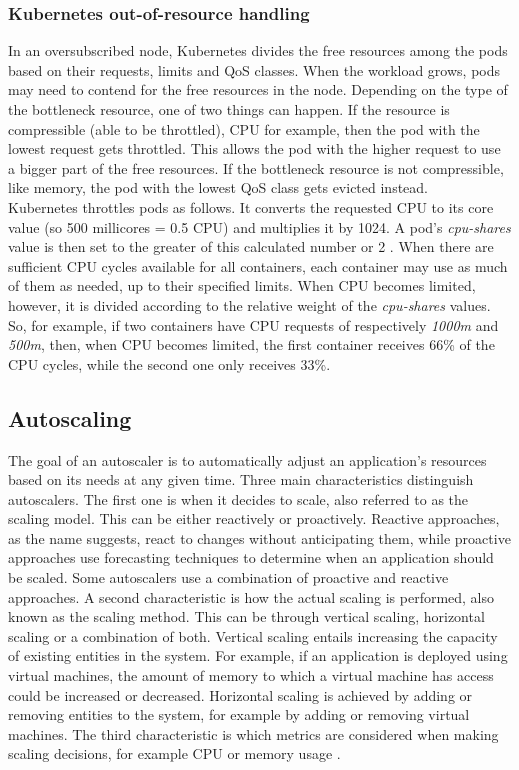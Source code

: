 \subsubsection{Kubernetes out-of-resource handling}\label{background:oversubscription}

In an oversubscribed node, Kubernetes divides the free resources among the pods based on their requests, limits and QoS classes. When the workload grows, pods may need to contend for the free resources in the node. Depending on the type of the bottleneck resource, one of two things can happen. If the resource is compressible (able to be throttled), CPU for example, then the pod with the lowest request gets throttled. This allows the pod with the higher request to use a bigger part of the free resources. If the bottleneck resource is not compressible, like memory, the pod with the lowest QoS class gets evicted instead. \\

Kubernetes throttles pods as follows. It converts the requested CPU to its core value (so 500 millicores = 0.5 CPU) and multiplies it by 1024. A pod's \textit{cpu-shares} value is then set to the greater of this calculated number or 2 \citep{Kubernetes-cpu-shares}. When there are sufficient CPU cycles available for all containers, each container may use as much of them as needed, up to their specified limits. When CPU becomes limited, however, it is divided according to the relative weight of the \textit{cpu-shares} values. So, for example, if two containers have CPU requests of respectively \textit{1000m} and \textit{500m}, then, when CPU becomes limited, the first container receives 66\% of the CPU cycles, while the second one only receives 33\%\citep{Docker-cpu-shares}.\\

\subsection{Autoscaling}
The goal of an autoscaler is to automatically adjust an application's resources based on its needs at any given time. Three main characteristics distinguish autoscalers. 
The first one is when it decides to scale, also referred to as the scaling model. This can be either reactively or proactively. Reactive approaches, as the name suggests, react to changes without anticipating them, while proactive approaches use forecasting techniques to determine when an application should be scaled. Some autoscalers use a combination of proactive and reactive approaches. 
A second characteristic is how the actual scaling is performed, also known as the scaling method. This can be through vertical scaling, horizontal scaling or a combination of both. Vertical scaling entails increasing the capacity of existing entities in the system. For example, if an application is deployed using virtual machines, the amount of memory to which a virtual machine has access could be increased or decreased. Horizontal scaling is achieved by adding or removing entities to the system, for example by adding or removing virtual machines. The third characteristic is which metrics are considered when making scaling decisions, for example CPU or memory usage \citep{CoutinhoEmanuel2015Eicc}. 

